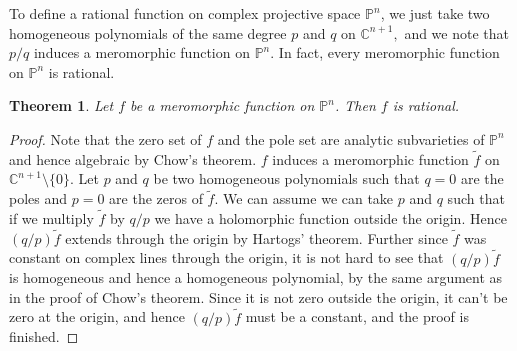 \documentclass[12pt]{article}
\theoremstyle{theorem}
\newtheorem*{thm}{Theorem}
\theoremstyle{definition}
\theoremstyle{remark}
\begin{document}
To define a rational function on complex projective space ${\mathbb{P}}^n$, we just take
two homogeneous polynomials of the same degree $p$ and $q$ on ${\mathbb{C}}^{n+1},$ and we 
note that $p/q$ induces a meromorphic function on ${\mathbb{P}}^n.$  In fact, every
meromorphic function on ${\mathbb{P}}^n$ is rational.

\begin{thm}
Let $f$ be a meromorphic function on ${\mathbb{P}}^n$.
Then $f$ is rational.
\end{thm}

\begin{proof}
Note that the zero set of $f$ and the pole set are analytic subvarieties of ${\mathbb{P}}^n$
and hence algebraic by Chow's theorem.  $f$ induces a meromorphic function $\tilde{f}$ on
${\mathbb{C}}^{n+1} \setminus \{ 0 \}$.  Let $p$ and $q$ be two homogeneous polynomials
such that $q = 0$ are the poles and $p=0$ are the zeros of $\tilde{f}.$  We can assume we can take $p$ and $q$ such that if we multiply $\tilde{f}$
by $q/p$ we have a holomorphic function outside the origin.  Hence $(q/p)\tilde{f}$ extends through the origin
by Hartogs' theorem.   Further since $\tilde{f}$ was 
constant on complex lines through the origin, it is not hard to see that $(q/p)\tilde{f}$ is homogeneous
and hence a homogeneous polynomial, by the same argument as in the proof of Chow's theorem.
Since it is not zero outside the origin, it can't be zero at the origin, and hence $(q/p)\tilde{f}$
must be a constant, and the proof is finished.
\end{proof}

\end{document}
